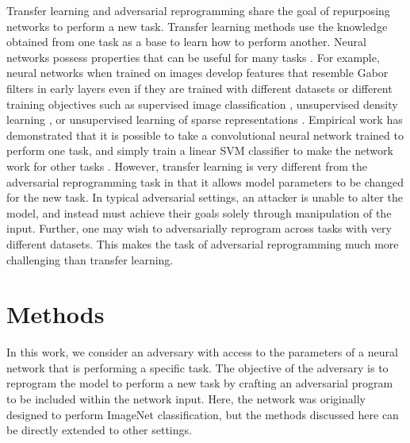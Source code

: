 \documentclass{article}
\begin{document}
Transfer learning \citep{raina2007self, mesnil2011unsupervised} and adversarial reprogramming share the goal of repurposing networks to perform a new task. 
Transfer learning methods use the knowledge obtained from one task as a base to learn how to perform another. Neural networks possess properties that can be useful for many tasks \citep{yosinski2014transferable}. For example, neural networks when trained on images develop features that resemble Gabor filters in early layers even if they are trained with different datasets or different training objectives such as supervised image classification \citep{krizhevsky2012imagenet}, unsupervised density learning \citep{lee2009convolutional}, or unsupervised learning of sparse representations \citep{le2011ica}. Empirical work has demonstrated that it is possible to take a convolutional neural network trained to perform one task, and simply train a linear SVM classifier to make the network work for other tasks \citep{razavian2014cnn, donahue2014decaf}. 
However, transfer learning is very different from the adversarial reprogramming task in that it allows model parameters to be changed for the new task. In typical adversarial settings, an attacker is unable to alter the model, and instead must achieve their goals solely through manipulation of the input. Further, one may wish to adversarially reprogram across tasks with very different datasets. This makes the task of adversarial reprogramming much more challenging than transfer learning. 

\section{Methods}\label{sec method}

In this work, we consider an adversary with access to the parameters of a neural network that is performing a specific task. The objective of the adversary is to reprogram the model to perform a new task by crafting an adversarial program to be included within the network input. Here, the network was originally designed to perform ImageNet classification, but the methods discussed here can be directly extended to other settings.
\end{document}
